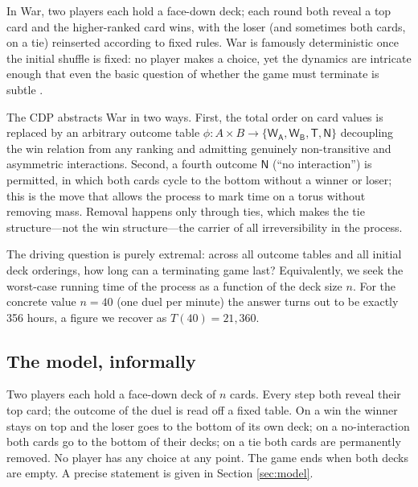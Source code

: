 \documentclass[12pt]{article}
\newcommand{\WA}{\mathsf{W_A}}
\newcommand{\WB}{\mathsf{W_B}}
\newcommand{\TT}{\mathsf{T}}
\newcommand{\NN}{\mathsf{N}}
\begin{document}
In War, two players each hold a face-down deck; each round both reveal a top card and the higher-ranked card wins, with the loser (and sometimes both cards, on a tie) reinserted according to fixed rules. War is famously deterministic once the initial shuffle is fixed: no player makes a choice, yet the dynamics are intricate enough that even the basic question of whether the game must terminate is subtle \cite{LR}. 

The CDP abstracts War in two ways. First, the total order on card values is replaced by an arbitrary outcome table $\phi:A\times B\rightarrow\{\WA,\WB,\TT,\NN\}$ decoupling the win relation from any ranking and admitting genuinely non-transitive and asymmetric interactions. Second, a fourth outcome $\NN$ (``no interaction'') is permitted, in which both cards cycle to the bottom without a winner or loser; this is the move that allows the process to mark time on a torus without removing mass. Removal happens only through ties, which makes the tie structure---not the win structure---the carrier of all irreversibility in the process. 

The driving question is purely extremal: across all outcome tables and all initial deck orderings, how long can a terminating game last? Equivalently, we seek the worst-case running time of the process as a function of the deck size $n$. For the concrete value $n=40$ (one duel per minute) the answer turns out to be exactly 356 hours, a figure we recover as $T(40) = 21,360$.

\subsection{The model, informally}
Two players each hold a face-down deck of $n$ cards. Every step both reveal their top card; the outcome of the duel is read off a fixed table. On a win the winner stays on top and the loser goes to the bottom of its own deck; on a no-interaction both cards go to the bottom of their decks; on a tie both cards are permanently removed. No player has any choice at any point. The game ends when both decks are empty. A precise statement is given in Section \ref{sec:model}.
\end{document}
